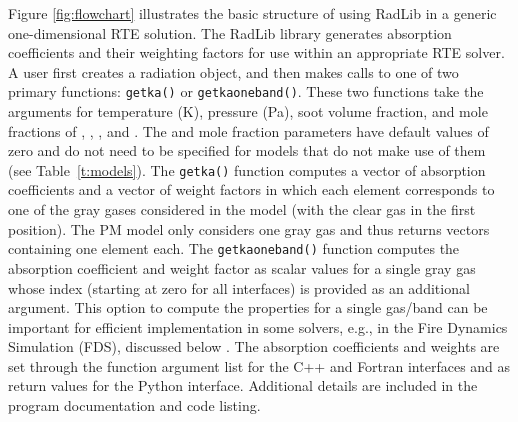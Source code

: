 \documentclass[preprint,12pt]{elsarticle}
\begin{document}
Figure \ref{fig:flowchart} illustrates the basic structure of using RadLib in a generic one-dimensional RTE solution. The RadLib library generates absorption coefficients and their weighting factors for use within an appropriate RTE solver. A user first creates a radiation object, and then makes calls to one of two primary functions: \texttt{get\textunderscore k\textunderscore a()} or \texttt{get\textunderscore k\textunderscore a\textunderscore oneband()}. These two functions take the arguments for temperature (K), pressure (Pa), soot volume fraction, and mole fractions of , , , and . The  and  mole fraction parameters have default values of zero and do not need to be specified for models that do not make use of them (see Table~\ref{t:models}). The \texttt{get\textunderscore k\textunderscore a()} function computes a vector of absorption coefficients and a vector of weight factors in which each element corresponds to one of the gray gases considered in the model (with the clear gas in the first position). The PM model only considers one gray gas and thus returns vectors containing one element each. The \texttt{get\textunderscore k\textunderscore a\textunderscore oneband()} function computes the absorption coefficient and weight factor as scalar values for a single gray gas whose index (starting at zero for all interfaces) is provided as an additional argument. This option to compute the properties for a single gas/band can be important for efficient implementation in some solvers, e.g., in the Fire Dynamics Simulation (FDS), discussed below \cite{FDS}. The absorption coefficients and weights are set through the function argument list for the C++ and Fortran interfaces and as return values for the Python interface.  Additional details are included in the program documentation and code listing.
%
\end{document}

